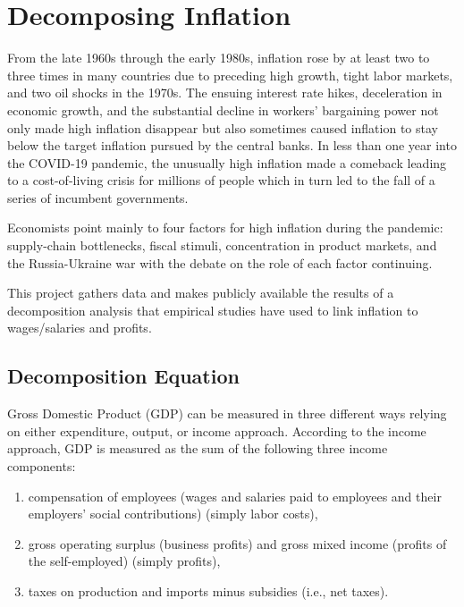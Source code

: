 \documentclass[
  letterpaper,
  DIV=11,
  numbers=noendperiod]{scrartcl}
\author{}
\date{}
\providecommand{\tightlist}{%
  \setlength{\itemsep}{0pt}\setlength{\parskip}{0pt}}\usepackage{longtable,booktabs,array}
\begin{document}
\section{Decomposing Inflation}\label{decomposing-inflation}

From the late 1960s through the early 1980s, inflation rose by at least
two to three times in many countries due to preceding high growth, tight
labor markets, and two oil shocks in the 1970s. The ensuing interest
rate hikes, deceleration in economic growth, and the substantial decline
in workers' bargaining power not only made high inflation disappear but
also sometimes caused inflation to stay below the target inflation
pursued by the central banks. In less than one year into the COVID-19
pandemic, the unusually high inflation made a comeback leading to a
cost-of-living crisis for millions of people which in turn led to the
fall of a series of incumbent governments.

Economists point mainly to four factors for high inflation during the
pandemic: supply-chain bottlenecks, fiscal stimuli, concentration in
product markets, and the Russia-Ukraine war with the debate on the role
of each factor continuing.

This project gathers data and makes publicly available the results of a
decomposition analysis that empirical studies have used to link
inflation to wages/salaries and profits.

\subsection{Decomposition Equation}\label{decomposition-equation}

Gross Domestic Product (GDP) can be measured in three different ways
relying on either expenditure, output, or income approach. According to
the income approach, GDP is measured as the sum of the following three
income components:

\begin{enumerate}
\def\labelenumi{\arabic{enumi}.}
\tightlist
\item
  compensation of employees (wages and salaries paid to employees and
  their employers' social contributions) (simply labor costs),
\item
  gross operating surplus (business profits) and gross mixed income
  (profits of the self-employed) (simply profits),
\item
  taxes on production and imports minus subsidies (i.e., net taxes).
\end{enumerate}
\end{document}

